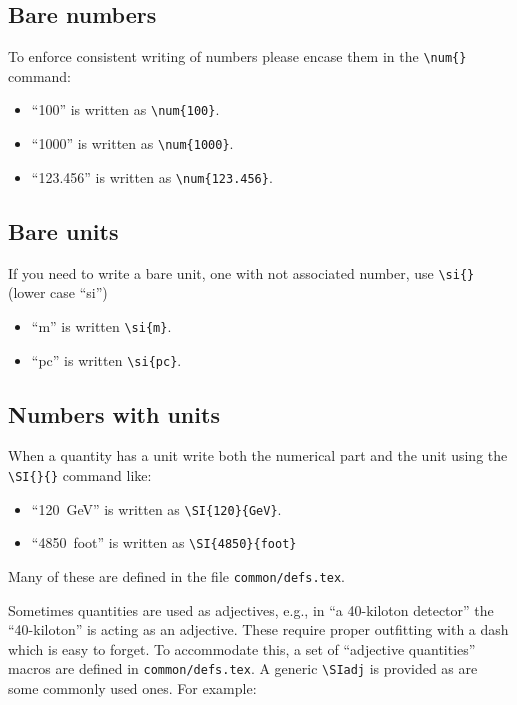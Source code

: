 \subsection{Bare numbers}

To enforce consistent writing of numbers please encase them in the
\verb|\num{}| command:

\begin{itemize}
\item ``\num{100}'' is written as \verb|\num{100}|.
\item ``\num{1000}'' is written as \verb|\num{1000}|.
\item ``\num{123.456}'' is written as \verb|\num{123.456}|.
\end{itemize}

\subsection{Bare units}

If you need to write a bare unit, one with not associated number, use
\verb|\si{}| (lower case ``si'')

\begin{itemize}
\item ``\si{m}'' is written \verb|\si{m}|.
\item ``\si{pc}'' is written \verb|\si{pc}|.
\end{itemize}

\subsection{Numbers with units}

When a quantity has a unit write both the numerical part and the unit
using the \verb|\SI{}{}| command like:

\begin{itemize}
\item ``\SI{120}{GeV}'' is written as \verb|\SI{120}{GeV}|.
\item ``\SI{4850}{foot}'' is written as \verb|\SI{4850}{foot}|
\end{itemize}

Many of these are defined in the file \texttt{common/defs.tex}.

Sometimes quantities are used as adjectives, e.g., in ``a 40-kiloton detector'' the ``40-kiloton'' is acting as an adjective.
These require proper outfitting with a dash which is easy to forget.
To accommodate this, a set of ``adjective quantities'' macros are defined in \texttt{common/defs.tex}.
A generic \verb|\SIadj| is provided as are some commonly used ones.
For example:

